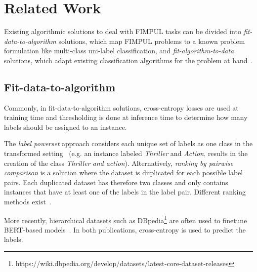 
\section{Related Work}
\label{sec:org2aceb9f}

Existing algorithmic solutions to deal with FIMPUL tasks can be divided into
\emph{fit-data-to-algorithm} solutions, which map FIMPUL problems to a known
problem formulation like multi-class uni-label classification, and
\emph{fit-algorithm-to-data} solutions, which adapt existing classification
algorithms for the problem at hand~\citep{multilabelMethods}.

\subsection{Fit-data-to-algorithm}
Commonly, in fit-data-to-algorithm solutions, cross-entropy losses are used at
training time and thresholding is done at inference time to determine how many
labels should be assigned to an instance.

The \textit{label powerset} approach considers each unique set of labels as
one class in the transformed setting~\cite{multilabelComparison} (e.g. an
instance labeled \textit{Thriller} and \textit{Action}, results in the
creation of the class \textit{Thriller and action}). Alternatively,
\textit{ranking by pairwise comparison} is a solution where the dataset is
duplicated for each possible label pairs. Each duplicated dataset has
therefore two classes and only contains instances that have at least one of
the labels in the label pair. Different ranking methods
exist~\cite{pairwiseBinary, pairwiseNet}.

More recently, hierarchical datasets such as
DBpedia\footnote{https://wiki.dbpedia.org/develop/datasets/latest-core-dataset-releases}
are often used to finetune BERT-based models~\cite{XLNet, bigBird}. In both
publications, cross-entropy is used to predict the labels.

